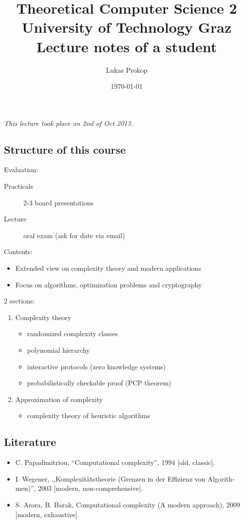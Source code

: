 \documentclass[a4paper]{article}
\title{
  Theoretical Computer Science 2 \\
  \large{University of Technology Graz} \\
  \normalsize{Lecture notes of a student}
}
\date{\today}
\author{Lukas Prokop}
\newcommand{\dateref}[1]{\emph{This lecture took place on #1.}\par}
\begin{document}
\maketitle
\tableofcontents
\newpage


\dateref{2nd of Oct 2013}
\subsection{Structure of this course}
%
Evaluation:
\begin{description}
  \item[Practicals] 2-3 board presentations
  \item[Lecture] oral exam (ask for date via email)
\end{description}

Contents:
\begin{itemize}
  \item Extended view on complexity theory and modern applications
  \item Focus on algorithms, optimization problems and cryptography
\end{itemize}

2 sections:
\begin{enumerate}
  \item Complexity theory
    \begin{itemize}
      \item randomized complexity classes
      \item polynomial hierarchy
      \item interactive protocols (zero knowledge systems)
      \item probabilistically checkable proof (PCP theorem)
    \end{itemize}
  \item Approximation of complexity
    \begin{itemize}
      \item complexity theory of heuristic algorithms
    \end{itemize}
\end{enumerate}

\subsection{Literature}
%
\begin{itemize}
  \item C. Papadimitriou, ``Computational complexity'', 1994 [old, classic].
  \item I. Wegener, \foreignlanguage{german}{,,Komplexitätstheorie (Grenzen in der Effizienz von Algorithmen)''}, 2003 [modern, non-comprehensive].
  \item S. Arora, B. Barak, Computational complexity (A modern approach), 2009 [modern, exhaustive].
\end{itemize}
\end{document}
